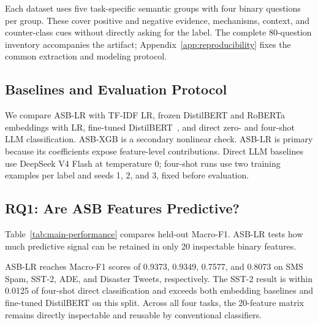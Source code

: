 \documentclass[runningheads]{llncs}
\begin{document}
Each dataset uses five task-specific semantic groups with four binary questions per group. These cover positive and negative evidence, mechanisms, context, and counter-class cues without directly asking for the label. The complete 80-question inventory accompanies the artifact; Appendix~\ref{app:reproducibility} fixes the common extraction and modeling protocol.

\subsection{Baselines and Evaluation Protocol}

We compare ASB-LR with TF-IDF LR, frozen DistilBERT and RoBERTa embeddings with LR, fine-tuned DistilBERT~\cite{sanh2019distilbert}, and direct zero- and four-shot LLM classification. ASB-XGB is a secondary nonlinear check. ASB-LR is primary because its coefficients expose feature-level contributions. Direct LLM baselines use DeepSeek V4 Flash at temperature 0; four-shot runs use two training examples per label and seeds 1, 2, and 3, fixed before evaluation.

\subsection{RQ1: Are ASB Features Predictive?}

Table~\ref{tab:main-performance} compares held-out Macro-F1. ASB-LR tests how much predictive signal can be retained in only 20 inspectable binary features.

ASB-LR reaches Macro-F1 scores of 0.9373, 0.9349, 0.7577, and 0.8073 on SMS Spam, SST-2, ADE, and Disaster Tweets, respectively. The SST-2 result is within 0.0125 of four-shot direct classification and exceeds both embedding baselines and fine-tuned DistilBERT on this split. Across all four tasks, the 20-feature matrix remains directly inspectable and reusable by conventional classifiers.

\begin{table}[!tbp]
\centering
\caption{Held-out Macro-F1. Values are point estimates or means over seeds where applicable.}
\label{tab:main-performance}
\setlength{\tabcolsep}{5.0pt}
\end{table}
\end{document}
